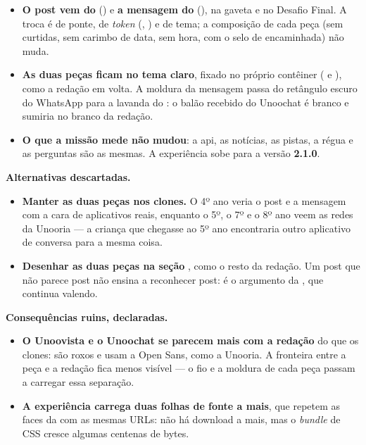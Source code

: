 \begin{itemize}
  \item \textbf{O post vem do } () e
    \textbf{a mensagem do } (), na gaveta
    e no Desafio Final. A troca é de ponte, de \emph{token} (,
    ) e de tema; a composição de cada peça (sem curtidas, sem
    carimbo de data, sem hora, com o selo de encaminhada) não muda.
  \item \textbf{As duas peças ficam no tema claro}, fixado no próprio
    contêiner ( e ),
    como a redação em volta. A moldura da mensagem passa do retângulo escuro do
    WhatsApp para a lavanda do : o balão recebido
    do Unoochat é branco e sumiria no branco da redação.
  \item \textbf{O que a missão mede não mudou}: a api, as notícias, as
    pistas, a régua e as perguntas são as mesmas. A experiência sobe para a
    versão \textbf{2.1.0}.
\end{itemize}

\textbf{Alternativas descartadas.}

\begin{itemize}
  \item \textbf{Manter as duas peças nos clones.} O 4º ano veria o post e a
    mensagem com a cara de aplicativos reais, enquanto o 5º, o 7º e o 8º ano
    veem as redes da Unooria --- a criança que chegasse ao 5º ano encontraria
    outro aplicativo de conversa para a mesma coisa.
  \item \textbf{Desenhar as duas peças na seção }, como o resto da
    redação. Um post que não parece post não ensina a reconhecer post: é o
    argumento da , que continua valendo.
\end{itemize}

\textbf{Consequências ruins, declaradas.}

\begin{itemize}
  \item \textbf{O Unoovista e o Unoochat se parecem mais com a redação} do que
    os clones: são roxos e usam a Open Sans, como a Unooria. A fronteira entre
    a peça e a redação fica menos visível --- o fio e a moldura de cada peça
    passam a carregar essa separação.
  \item \textbf{A experiência carrega duas folhas de fonte a mais}, que repetem
    as faces da  com as mesmas URLs: não há download a
    mais, mas o \emph{bundle} de CSS cresce algumas centenas de bytes.
\end{itemize}

